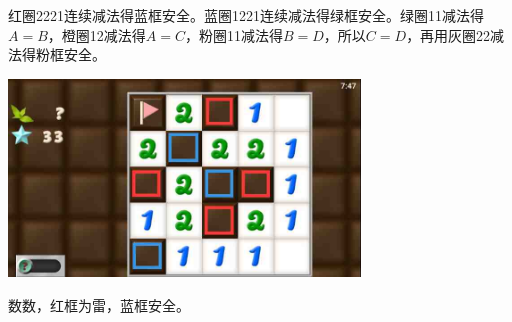 红圈2221连续减法得蓝框安全。蓝圈1221连续减法得绿框安全。绿圈11减法得$A=B$，橙圈12减法得$A=C$，粉圈11减法得$B=D$，所以$C=D$，再用灰圈22减法得粉框安全。
\begin{center}
    \includegraphics[width=0.7\textwidth]{puzzlelow/217-5.jpg}
\end{center}
数数，红框为雷，蓝框安全。

